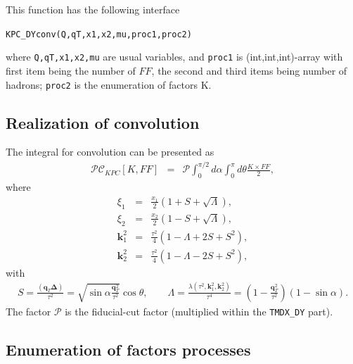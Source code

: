 \documentclass[prd,nofootinbib,eqsecnum,final]{revtex4}
\renewcommand{\(}{\left(}
\renewcommand{\)}{\right)}
\renewcommand{\[}{\left[}
\renewcommand{\]}{\right]}
\renewcommand{\vec}[1]{\bm{#1}}
\begin{document}
This function has the following interface
\begin{center}
\texttt{KPC\_DYconv(Q,qT,x1,x2,mu,proc1,proc2)}
\end{center}
where \texttt{Q,qT,x1,x2,mu} are usual variables, and \texttt{proc1} is (int,int,int)-array with first item being the number of $FF$, the second and third items being number of hadrons; \texttt{proc2} is the enumeration of factors K.

\subsection{Realization of convolution}

The integral for convolution can be presented as
\begin{eqnarray}
\mathcal{P} \mathcal{C}_{KPC}[K,FF]&=&\mathcal{P}
\int_{0}^{\pi/2}d\alpha \int_0^{\pi}d\theta  \frac{K \times FF }{2},
\end{eqnarray}
where 
\begin{eqnarray}
\xi_1&=&\frac{x_1}{2}\(1+S+\sqrt{\Lambda}\),
\\
\xi_2&=&\frac{x_2}{2}\(1-S+\sqrt{\Lambda}\),
\\
\vec k_1^2&=&\frac{\tau^2}{4}\(1-\Lambda+2S+S^2\),
\\
\vec k_2^2&=&\frac{\tau^2}{4}\(1-\Lambda-2S+S^2\),
\end{eqnarray}
with
\begin{eqnarray}
S=\frac{(\vec q_T\vec \Delta)}{\tau^2}=\sqrt{\sin \alpha \frac{\vec q_T^2}{\tau^2}}\cos\theta,\qquad \Lambda=\frac{\lambda(\tau^2,\vec k_1^2,\vec k_2^2)}{\tau^4}=\(1-\frac{\vec q_T^2}{\tau^2}\)\(1-\sin\alpha\).
\end{eqnarray}
The factor $\mathcal{P}$ is the fiducial-cut factor (multiplied within the \texttt{TMDX\_DY} part).

\subsection{Enumeration of factors processes}
\end{document}
